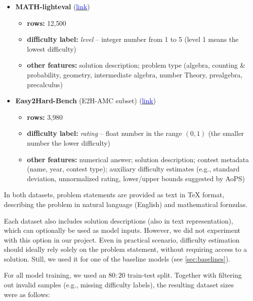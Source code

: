 \documentclass[runningheads]{llncs}
\begin{document}
\begin{itemize}
    \item \textbf{MATH-lighteval} \cite{math} (\href{https://huggingface.co/datasets/DigitalLearningGmbH/MATH-lighteval}{\textcolor{blue}{link}})
    \begin{itemize}
        \item \textbf{rows:} 12{,}500
        \item \textbf{difficulty label:} \textit{level} -- integer number from 1 to 5 (level 1 means the lowest difficulty)
        \item \textbf{other features:} solution description; problem type (algebra, counting \& probability, geometry, intermediate algebra, number Theory, prealgebra, precalculus)
    \end{itemize}

\vspace{10pt}

    \item \textbf{Easy2Hard-Bench} (E2H-AMC subset) \cite{easy2hard} (\href{https://huggingface.co/datasets/furonghuang-lab/Easy2Hard-Bench}{\textcolor{blue}{link}})
    \begin{itemize}
        \item \textbf{rows:} 3{,}980
        \item \textbf{difficulty label:} \textit{rating} -- float number in the range $(0,1)$ (the smaller number the lower difficulty)
        \item \textbf{other features:} numerical answer; solution description; contest metadata (name, year, contest type); auxiliary difficulty estimates (e.g., standard deviation, unnormalized rating, lower/upper bounds suggested by AoPS)
    \end{itemize}
\end{itemize}

In both datasets, problem statements are provided as text in \TeX{} format, describing the problem in natural language (English) and mathematical formulas.

Each dataset also includes solution descriptions (also in text representation), which can optionally be used as model inputs. However, we did not experiment with this option in our project. Even in practical scenario, difficulty estimation should ideally rely solely on the problem statement, without requiring access to a solution. Still, we used it for one of the baseline models (see \cref{sec:baselines}).

For all model training, we used an $80:20$ train-test split. Together with filtering out invalid samples (e.g., missing difficulty labels), the resulting dataset sizes were as follows:
\end{document}
